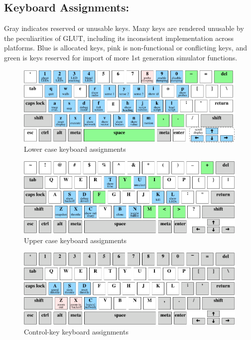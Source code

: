 \documentclass{article}
\begin{document}
\begin{appendix}
\section{Keyboard Assignments:}

Gray indicates reserved or unusable keys.  Many keys are rendered
unusable by the peculiarities of GLUT, including its inconsistent
implementation across platforms.  Blue is allocated keys, pink is
non-functional or conflicting keys, and green is keys reserved for
import of more 1st generation simulator functions.

\begin{figure}[hp]
\centering
\includegraphics[width=6in]{figures/keyboard-lower.pdf}
\caption{Lower case keyboard assignments}
\end{figure}

\begin{figure}[hp]
\centering
\includegraphics[width=6in]{figures/keyboard-upper.pdf}
\caption{Upper case keyboard assignments}
\end{figure}

\begin{figure}[hp]
\centering
\includegraphics[width=6in]{figures/keyboard-ctrl.pdf}
\caption{Control-key keyboard assignments}
\end{figure}


\end{appendix}
\end{document}
